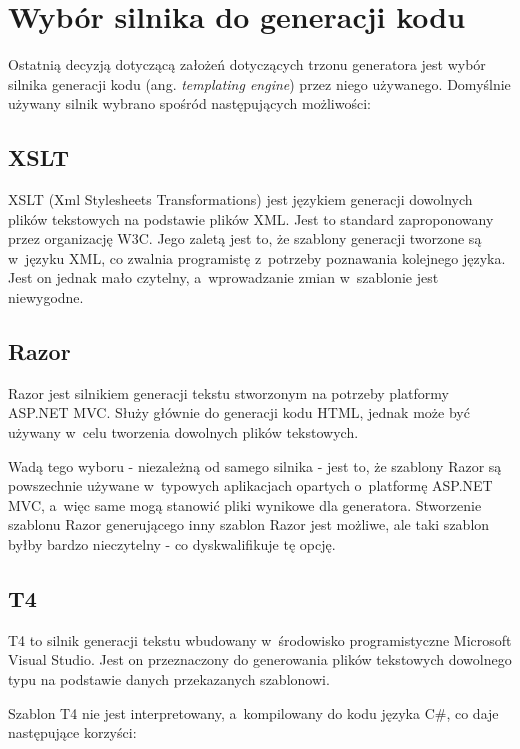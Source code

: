 \section{Wybór silnika do generacji kodu} \label{sec:core:templating_engine}

Ostatnią decyzją dotyczącą założeń dotyczących trzonu generatora jest wybór silnika generacji kodu (ang. \emph{templating engine}) przez niego używanego.
Domyślnie używany silnik wybrano spośród następujących możliwości:


\subsection{XSLT}

XSLT (Xml Stylesheets Transformations) jest językiem generacji dowolnych plików tekstowych na podstawie plików XML.
Jest to standard zaproponowany przez organizację W3C.
Jego zaletą jest to, że szablony generacji tworzone są w~języku XML, co zwalnia programistę z~potrzeby poznawania kolejnego języka.
Jest on jednak mało czytelny, a~wprowadzanie zmian w~szablonie jest niewygodne.


\subsection{Razor}

Razor jest silnikiem generacji tekstu stworzonym na potrzeby platformy ASP.NET MVC.
Służy głównie do generacji kodu HTML, jednak może być używany w~celu tworzenia dowolnych plików tekstowych.

Wadą tego wyboru - niezależną od samego silnika - jest to, że szablony Razor są powszechnie używane w~typowych aplikacjach opartych o~platformę ASP.NET MVC, a~więc same mogą stanowić pliki wynikowe dla generatora.
Stworzenie szablonu Razor generującego inny szablon Razor jest możliwe, ale taki szablon byłby bardzo nieczytelny - co dyskwalifikuje tę opcję.


\subsection{T4}

T4 to silnik generacji tekstu wbudowany w~środowisko programistyczne Microsoft Visual Studio.
Jest on przeznaczony do generowania plików tekstowych dowolnego typu na podstawie danych przekazanych szablonowi.

Szablon T4 nie jest interpretowany, a~kompilowany do kodu języka C\#, co daje następujące korzyści:


